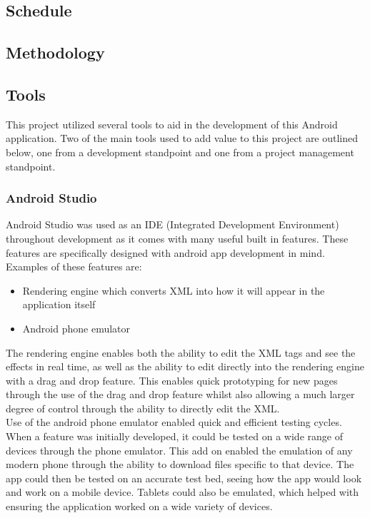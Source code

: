 \documentclass{article}
\begin{document}
\subsection{Schedule}

\subsection{Methodology}

\subsection{Tools}

This project utilized several tools to aid in the development of this Android application. Two of the main tools used to add value to this project are outlined below, one from a development standpoint and one from a project management standpoint. 

\subsubsection{Android Studio}

Android Studio was used as an IDE (Integrated Development Environment) throughout development as it comes with many useful built in features. These features are specifically designed with android app development in mind. Examples of these features are: 

\begin{itemize}
	\item Rendering engine which converts XML into how it will appear in the application itself
	\item Android phone emulator
\end{itemize}

The rendering engine enables both the ability to edit the XML tags and see the effects in real time, as well as the ability to edit directly into the rendering engine with a drag and drop feature. This enables quick prototyping for new pages through the use of the drag and drop feature whilst also allowing a much larger degree of control through the ability to directly edit the XML.\\

Use of the android phone emulator enabled quick and efficient testing cycles. When a feature was initially developed, it could be tested on a wide range of devices through the phone emulator. This add on enabled the emulation of any modern phone through the ability to download files specific to that device. The app could then be tested on an accurate test bed, seeing how the app would look and work on a mobile device. Tablets could also be emulated, which helped with ensuring the application worked on a wide variety of devices.\\
\end{document}
